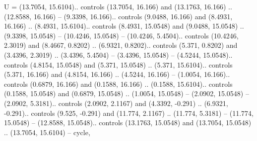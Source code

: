 {U} = {(13.7054, 15.6104).. controls (13.7054, 16.166) and (13.1763, 16.166) .. (12.8588, 16.166) -- (9.3398, 16.166).. controls (9.0488, 16.166) and (8.4931, 16.166) .. (8.4931, 15.6104).. controls (8.4931, 15.0548) and (9.0488, 15.0548) .. (9.3398, 15.0548) -- (10.4246, 15.0548) -- (10.4246, 5.4504).. controls (10.4246, 2.3019) and (8.4667, 0.8202) .. (6.9321, 0.8202).. controls (5.371, 0.8202) and (3.4396, 2.3019) .. (3.4396, 5.4504) -- (3.4396, 15.0548) -- (4.5244, 15.0548).. controls (4.8154, 15.0548) and (5.371, 15.0548) .. (5.371, 15.6104).. controls (5.371, 16.166) and (4.8154, 16.166) .. (4.5244, 16.166) -- (1.0054, 16.166).. controls (0.6879, 16.166) and (0.1588, 16.166) .. (0.1588, 15.6104).. controls (0.1588, 15.0548) and (0.6879, 15.0548) .. (1.0054, 15.0548) -- (2.0902, 15.0548) -- (2.0902, 5.3181).. controls (2.0902, 2.1167) and (4.3392, -0.291) .. (6.9321, -0.291).. controls (9.525, -0.291) and (11.774, 2.1167) .. (11.774, 5.3181) -- (11.774, 15.0548) -- (12.8588, 15.0548).. controls (13.1763, 15.0548) and (13.7054, 15.0548) .. (13.7054, 15.6104) -- cycle},
